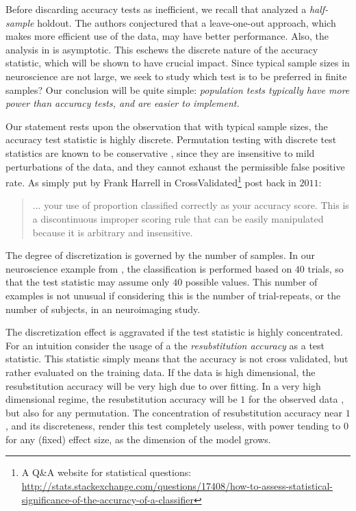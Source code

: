 \documentclass[12pt,a4paper]{article}
\theoremstyle{definition}
\begin{document}
Before discarding accuracy tests as inefficient, we recall that \cite{ramdas_classification_2016} analyzed a \emph{half-sample} holdout. 
The authors conjectured that a leave-one-out approach, which makes more efficient use of the data, may have better performance. 
Also, the analysis in \cite{ramdas_classification_2016} is asymptotic. 
This eschews the discrete nature of the accuracy statistic, which will be shown to have  crucial impact. 
Since typical sample sizes in neuroscience are not large, we seek to study which test is to be preferred in finite samples? 
Our conclusion will be quite simple: {\em population tests typically have more power than accuracy tests, and are easier to implement.}

Our statement rests upon the observation that with typical sample sizes, the accuracy test statistic is highly discrete. 
Permutation testing with discrete test statistics are known to be conservative \citep{hemerik_exact_2014}, since they are insensitive to mild perturbations of the data, and they cannot exhaust the permissible false positive rate. 
As simply put by Frank Harrell in \textsf{CrossValidated\footnote{A Q\&A website for statistical questions: \url{http://stats.stackexchange.com/questions/17408/how-to-assess-statistical-significance-of-the-accuracy-of-a-classifier}}} post back in $2011$:
\begin{quote}
	... your use of proportion classified correctly as your accuracy score. This is a discontinuous improper scoring rule that can be easily manipulated because it is arbitrary and insensitive.
\end{quote}


The degree of discretization is governed by the number of samples. 
In our neuroscience example from \citet{gilron_quantifying_2016}, the classification is performed based on $40$ trials, so that the test statistic may assume only $40$ possible values. 
This number of examples is not unusual if considering this is the number of trial-repeats, or the number of subjects, in an neuroimaging study. 

The discretization effect is aggravated if the test statistic is highly concentrated. 
For an intuition consider the usage of a the \emph{resubstitution accuracy} as a test statistic. 
This statistic simply means that the accuracy is not cross validated, but rather evaluated on the training data.
If the data is high dimensional, the resubstitution accuracy will be very high due to over fitting. 
In a very high dimensional regime, the resubstitution accuracy will be $1$ for the observed data \cite[Theorem 1]{mclachlan_bias_1976}, but also for any permutation.
The concentration of resubstitution accuracy near $1$, and its discreteness, render this test completely useless, with power tending to $0$ for any (fixed) effect size, as the dimension of the model grows. 
\end{document}
